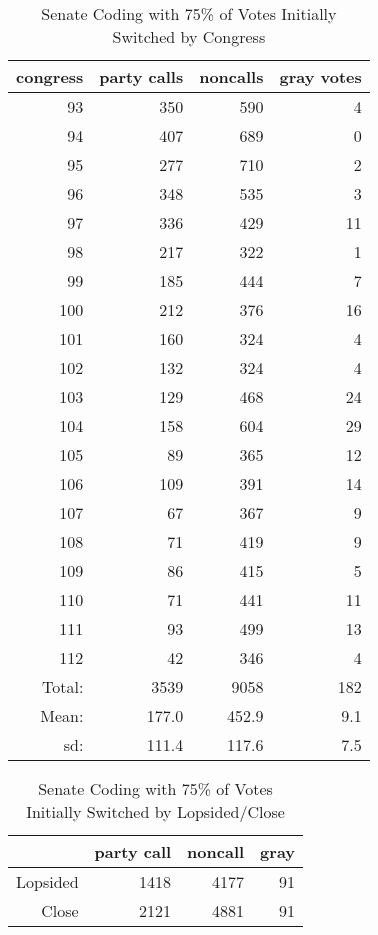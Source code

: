 \documentclass[12pt]{article}
\begin{document}
\begin{table}[ht]
	\centering
	\caption{Senate Coding with 75\% of Votes Initially Switched by Congress}
	\begin{tabular}{rrrr}
		\hline
		congress & party calls & noncalls & gray votes \\ 
		\hline
		93 & 350 & 590 &   4 \\ 
		94 & 407 & 689 &   0 \\ 
		95 & 277 & 710 &   2 \\ 
		96 & 348 & 535 &   3 \\ 
		97 & 336 & 429 &  11 \\ 
		98 & 217 & 322 &   1 \\ 
		99 & 185 & 444 &   7 \\ 
		100 & 212 & 376 &  16 \\ 
		101 & 160 & 324 &   4 \\ 
		102 & 132 & 324 &   4 \\ 
		103 & 129 & 468 &  24 \\ 
		104 & 158 & 604 &  29 \\ 
		105 &  89 & 365 &  12 \\ 
		106 & 109 & 391 &  14 \\ 
		107 &  67 & 367 &   9 \\ 
		108 &  71 & 419 &   9 \\ 
		109 &  86 & 415 &   5 \\ 
		110 &  71 & 441 &  11 \\ 
		111 &  93 & 499 &  13 \\ 
		112 &  42 & 346 &   4 \\ 
		\hline
		Total: & 3539 & 9058 & 182 \\
		Mean: & 177.0 & 452.9 & 9.1 \\
		sd: & 111.4 & 117.6 & 7.5 \\
		\hline
	\end{tabular}
\end{table}

\begin{table}[ht]
	\centering
	\caption{Senate Coding with 75\% of Votes Initially Switched by Lopsided/Close}
	\begin{tabular}{rrrr}
		\hline
		& party call  & noncall & gray \\ 
		\hline
		Lopsided & 1418 & 4177 & 91 \\ 
		Close & 2121 & 4881 & 91 \\ 
		\hline
	\end{tabular}
\end{table}
\end{document}
